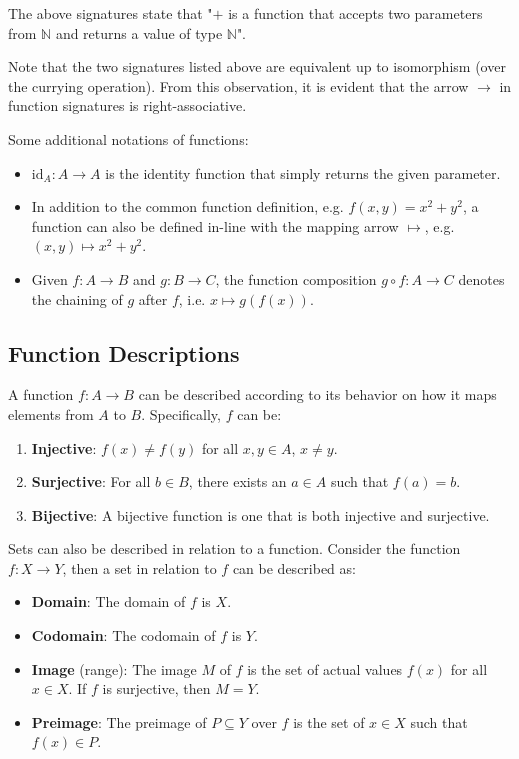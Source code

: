 \documentclass[12pt]{article}
\theoremstyle{definition}
\newcommand{\NN}{\mathbb{N}}
\newcommand{\id}[1]{\text{id}_{#1}}
\begin{document}
 	The above signatures state that "$+$ is a function that accepts two parameters from $\NN$ and returns a value of type $\NN$".
 	
 	Note that the two signatures listed above are equivalent up to isomorphism (over the currying operation). From this observation, it is evident that the arrow $\to$ in function signatures is right-associative.
 	
 	Some additional notations of functions:
 	\begin{itemize}
 		\item $\id{A}: A \to A$ is the identity function that simply returns the given parameter.
 		\item In addition to the common function definition, e.g. $f(x, y) = x^2 + y^2$, a function can also be defined in-line with the mapping arrow $\mapsto$, e.g. $(x, y) \mapsto x^2 + y^2$.
 		\item Given $f : A \to B$ and $g : B \to C$, the function composition $g \circ f : A \to C$ denotes the chaining of $g$ after $f$, i.e. $x \mapsto g(f(x))$.
 	\end{itemize}
 	
 	\subsection{Function Descriptions}
 	
 	A function $f : A \to B$ can be described according to its behavior on how it maps elements from $A$ to $B$. Specifically, $f$ can be:
 	\begin{enumerate}
 		\item \textbf{Injective}: $f(x) \neq f(y)$ for all $x, y \in A$, $x \neq y$.
 		\item \textbf{Surjective}: For all $b \in B$, there exists an $a \in A$ such that $f(a) = b$.
 		\item \textbf{Bijective}: A bijective function is one that is both injective and surjective.
 	\end{enumerate}
 	
 	Sets can also be described in relation to a function. Consider the function $f : X \to Y$, then a set in relation to $f$ can be described as:
 	\begin{itemize}
 		\item \textbf{Domain}: The domain of $f$ is $X$.
 		\item \textbf{Codomain}: The codomain of $f$ is $Y$.
 		\item \textbf{Image} (range): The image $M$ of $f$ is the set of actual values $f(x)$ for all $x \in X$. If $f$ is surjective, then $M = Y$.
 		\item \textbf{Preimage}: The preimage of $P \subseteq Y$ over $f$ is the set of $x \in X$ such that $f(x) \in P$.
 	\end{itemize}
 	
\end{document}

